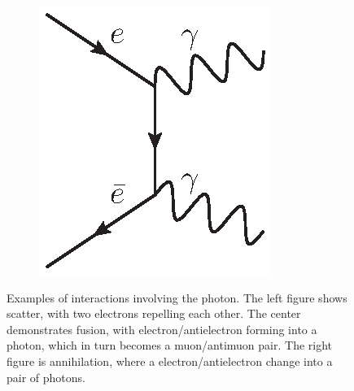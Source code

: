 \begin{figure}[!htbp]
\begin{subfigure}[b]{0.5\textwidth}
        \caption{}
        \label{fig:FermionPhotonFussion}
    \end{subfigure}%
    \begin{subfigure}[b]{0.3\textwidth}
        \includegraphics[width=\linewidth]{figures/annailation.eps}
        \caption{}
        \label{fig:PairAnnialation}
    \end{subfigure}%

    \caption[
        Photon interaction examples
    ]{
    Examples of interactions involving the photon. The left figure shows scatter, with two electrons repelling each other. The center demonstrates fusion, with electron/antielectron forming into a photon, which in turn becomes a muon/antimuon pair. The right figure is annihilation, where a electron/antielectron change into a pair of photons.
    }
    \label{fig:PhotonExamples}
\end{figure}